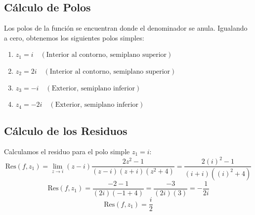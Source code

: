 \documentclass[a4paper, 12pt]{article}
\begin{document}
\subsection*{Cálculo de Polos}
Los polos de la función se encuentran donde el denominador se anula. Igualando a cero, obtenemos los siguientes polos simples:
\begin{enumerate}
    \item $z_1 = i \quad (\text{Interior al contorno, semiplano superior})$
    \item $z_2 = 2i \quad (\text{Interior al contorno, semiplano superior})$
    \item $z_3 = -i \quad (\text{Exterior, semiplano inferior})$
    \item $z_4 = -2i \quad (\text{Exterior, semiplano inferior})$
\end{enumerate}
\begin{center}
\end{center}
\subsection*{Cálculo de los Residuos}
Calculamos el residuo para el polo simple $z_1 = i$:
\[
\text{Res}(f, z_1) = \lim_{z \to i} (z-i) \frac{2z^2 - 1}{(z-i)(z+i)(z^2+4)} = \frac{2(i)^2 - 1}{(i+i)((i)^2+4)}
\]
\[
\text{Res}(f, z_1) = \frac{-2 - 1}{(2i)(-1+4)} = \frac{-3}{(2i)(3)} = -\frac{1}{2i} \]
\[
\boxed{\text{Res}(f, z_1) = \frac{i}{2}}
\]
\end{document}
